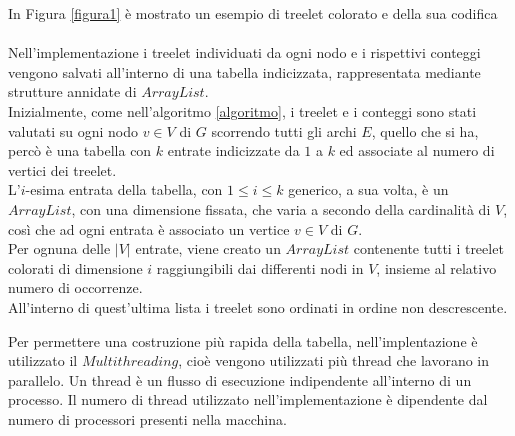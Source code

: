  In Figura \ref{figura1} \`e mostrato un esempio di treelet colorato e della sua codifica\\\\
Nell'implementazione i treelet individuati da ogni nodo e i rispettivi conteggi vengono salvati all'interno di una tabella indicizzata, rappresentata mediante strutture annidate di $ ArrayList $.\\
Inizialmente, come nell'algoritmo \ref{algoritmo}, i treelet e i conteggi sono stati valutati su ogni nodo $ v \in V $ di $ G $ scorrendo tutti gli archi $ E $, quello che si ha, perc\`o \`e una tabella con $ k $ entrate indicizzate da $ 1 $ a $ k $ ed associate al numero di vertici dei treelet.\\ 
L'$ i $-esima entrata della tabella, con $ 1\le i \le k $ generico, a sua volta, \`e un $ ArrayList $, con una dimensione fissata, che varia a secondo della cardinalit\`a di $ V $, cos\`i che ad ogni entrata \`e associato un vertice $ v\in V $ di $ G $.\\
Per ognuna delle $ |V| $ entrate, viene creato un $ ArrayList $ contenente tutti i treelet colorati di dimensione $ i $ raggiungibili dai differenti nodi in $ V $, insieme al relativo numero di occorrenze.\\
All'interno di quest'ultima lista i treelet sono ordinati in ordine non descrescente.

Per permettere una costruzione pi\`u rapida della tabella, nell'implentazione \`e utilizzato il $ Multithreading $, cio\`e vengono utilizzati pi\`u thread che lavorano in parallelo.
Un thread \`e un flusso di esecuzione indipendente all'interno di un processo.
Il numero di thread utilizzato nell'implementazione \`e dipendente dal numero di processori presenti nella macchina.




	
